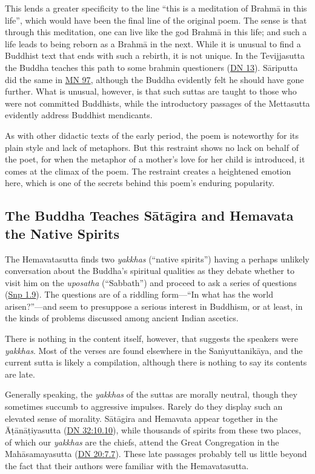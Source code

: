 \documentclass[12pt,openany]{book}%
\begin{document}
This lends a greater specificity to the line “this is a meditation of \textsanskrit{Brahmā} in this life”, which would have been the final line of the original poem. The sense is that through this meditation, one can live like the god \textsanskrit{Brahmā} in this life; and such a life leads to being reborn as a \textsanskrit{Brahmā} in the next. While it is unusual to find a Buddhist text that ends with such a rebirth, it is not unique. In the Tevijjasutta the Buddha teaches this path to some brahmin questioners (\href{https://suttacentral.net/dn13/en/sujato}{DN 13}). \textsanskrit{Sāriputta} did the same in \href{https://suttacentral.net/mn97/en/sujato}{MN 97}, although the Buddha evidently felt he should have gone further. What is unusual, however, is that such suttas are taught to those who were not committed Buddhists, while the introductory passages of the Mettasutta evidently address Buddhist mendicants.

As with other didactic texts of the early period, the poem is noteworthy for its plain style and lack of metaphors. But this restraint shows no lack on behalf of the poet, for when the metaphor of a mother’s love for her child is introduced, it comes at the climax of the poem. The restraint creates a heightened emotion here, which is one of the secrets behind this poem’s enduring popularity.

\subsection*{The Buddha Teaches \textsanskrit{Sātāgira} and Hemavata the Native Spirits}

The Hemavatasutta finds two \textit{yakkhas} (“native spirits”) having a perhaps unlikely conversation about the Buddha’s spiritual qualities as they debate whether to visit him on the \textit{uposatha} (“Sabbath”) and proceed to ask a series of questions (\href{https://suttacentral.net/snp1.9/en/sujato}{Snp 1.9}). The questions are of a riddling form—“In what has the world arisen?”—and seem to presuppose a serious interest in Buddhism, or at least, in the kinds of problems discussed among ancient Indian ascetics.

There is nothing in the content itself, however, that suggests the speakers were \textit{yakkhas}. Most of the verses are found elsewhere in the \textsanskrit{Saṁyuttanikāya}, and the current sutta is likely a compilation, although there is nothing to say its contents are late.

Generally speaking, the \textit{yakkhas} of the suttas are morally neutral, though they sometimes succumb to aggressive impulses. Rarely do they display such an elevated sense of morality. \textsanskrit{Sātāgira} and Hemavata appear together in the \textsanskrit{Āṭānāṭiyasutta} (\href{https://suttacentral.net/dn32/en/sujato\#10.10}{DN 32:10.10}), while thousands of spirits from these two places, of which our \textit{yakkhas} are the chiefs, attend the Great Congregation in the \textsanskrit{Mahāsamayasutta} (\href{https://suttacentral.net/dn20/en/sujato\#7.7}{DN 20:7.7}). These late passages probably tell us little beyond the fact that their authors were familiar with the Hemavatasutta.
\end{document}
